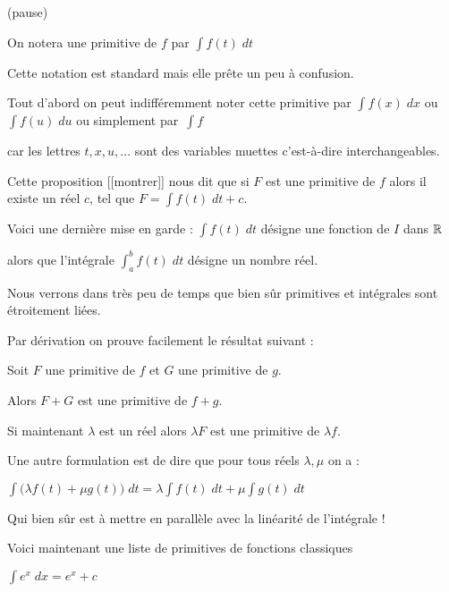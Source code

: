 (pause)


\change


On notera une primitive de $f$ par $\int f(t) \; dt$  

\change

Cette notation est standard mais elle prête un peu à confusion.

Tout d'abord on peut indifféremment noter cette primitive par 
$\int f(x) \; dx$ ou $\int f(u) \; du$ ou simplement par~$\int f$

car les lettres $t, x, u, ...$ sont  des variables muettes
c'est-à-dire interchangeables. 

\change


Cette proposition [[montrer]] nous dit que si $F$ est une primitive de $f$ 
alors il existe un réel $c$, tel que $F=\int f(t) \; dt + c$. 

\change

Voici une dernière mise en garde : $\int f(t)\;dt$ désigne une fonction de $I$ dans $\mathbb{R}$

\change

alors que l'intégrale $\int_a^b f(t) \; dt$ désigne un nombre réel.

Nous verrons dans très peu de temps que bien sûr primitives et intégrales sont étroitement liées.

\diapo

Par dérivation on prouve facilement le résultat suivant :

Soit $F$ une primitive de $f$ et $G$ une primitive de $g$. 

Alors $F+G$ est une
primitive de $f+g$.

\change

Si maintenant $\lambda$ est un réel alors $\lambda F$ est une primitive de $\lambda f$.

\change

Une autre formulation est de dire que pour tous réels $\lambda,\mu$ on a 
: 

$\int\big(\lambda f(t)+ \mu g(t)\big) \; dt=\lambda \int f(t) \; dt+\mu \int g(t)\; dt$

Qui bien sûr est à mettre en parallèle avec la linéarité de l'intégrale !


\diapo

Voici maintenant une liste de primitives de fonctions classiques

   $\int e^x \; dx  = e^x + c$

